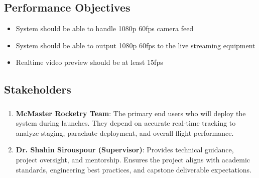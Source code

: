 \documentclass{article}
\begin{document}
\subsection{Performance Objectives}
\label{sec:performance}

\begin{itemize}
  \item System should be able to handle 1080p 60fps camera feed
  \item System should be able to output 1080p 60fps to the live streaming equipment
  \item Realtime video preview should be at least 15fps
\end{itemize}

\subsection{Stakeholders}

\subsubsection*{\color{blue}{Direct Stakeholders}}
\begin{enumerate}
  \item \textbf{McMaster Rocketry Team}: The primary end users who
        will deploy the system during launches. They depend on accurate
        real-time tracking to analyze staging, parachute deployment, and
        overall flight performance.

  \item \textbf{Dr. Shahin Sirouspour (Supervisor)}: Provides
        technical guidance, project oversight, and mentorship. Ensures
        the project aligns with academic standards, engineering best
        practices, and capstone deliverable expectations.
\end{enumerate}
\end{document}

